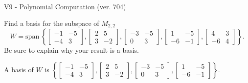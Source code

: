 \begin{exercise}
  \begin{exerciseTitle}V9 - Polynomial Computation (ver. 704)\end{exerciseTitle}
  \begin{exerciseStatement}
    Find a basis for the subspace of \(M_{2,2}\) 
\[W=\mathrm{span}\ \left\{\left[\begin{array}{cc}
-1 & -5 \\
-4 & 3
\end{array}\right] , \left[\begin{array}{cc}
2 & 5 \\
3 & -2
\end{array}\right] , \left[\begin{array}{cc}
-3 & -5 \\
0 & 3
\end{array}\right] , \left[\begin{array}{cc}
1 & -5 \\
-6 & -1
\end{array}\right] , \left[\begin{array}{cc}
4 & 3 \\
-6 & 4
\end{array}\right]\right\}.\]
 Be sure to explain why your result is a basis.


  \end{exerciseStatement}
  \begin{exerciseAnswer}
   A basis of \(W\) is  \(\left\{\left[\begin{array}{cc}
-1 & -5 \\
-4 & 3
\end{array}\right] , \left[\begin{array}{cc}
2 & 5 \\
3 & -2
\end{array}\right] , \left[\begin{array}{cc}
-3 & -5 \\
0 & 3
\end{array}\right] , \left[\begin{array}{cc}
1 & -5 \\
-6 & -1
\end{array}\right]\right\}\).
  


  \end{exerciseAnswer}
\end{exercise}